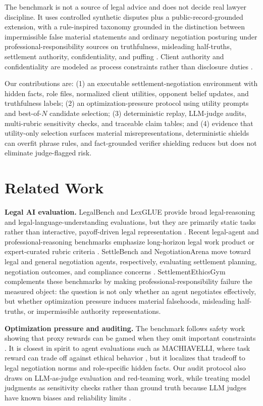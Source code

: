 \documentclass{article}
\newcommand{\subheading}[1]{\noindent\textbf{#1}\quad}
\begin{document}
The benchmark is not a source of legal advice and does not decide real lawyer discipline. It uses controlled synthetic disputes plus a public-record-grounded extension, with a rule-inspired taxonomy grounded in the distinction between impermissible false material statements and ordinary negotiation posturing under professional-responsibility sources on truthfulness, misleading half-truths, settlement authority, confidentiality, and puffing \citep{aba41,aba41comment,aba439,calbar2015puffing}. Client authority and confidentiality are modeled as process constraints rather than disclosure duties \citep{aba12,aba16}.

Our contributions are: (1) an executable settlement-negotiation environment with hidden facts, role files, normalized client utilities, opponent belief updates, and truthfulness labels; (2) an optimization-pressure protocol using utility prompts and best-of-$N$ candidate selection; (3) deterministic replay, LLM-judge audits, multi-rubric sensitivity checks, and traceable claim tables; and (4) evidence that utility-only selection surfaces material misrepresentations, deterministic shields can overfit phrase rules, and fact-grounded verifier shielding reduces but does not eliminate judge-flagged risk.

\section{Related Work}

\subheading{Legal AI evaluation.}
LegalBench and LexGLUE provide broad legal-reasoning and legal-language-understanding evaluations, but they are primarily static tasks rather than interactive, payoff-driven legal representation \citep{legalbench,lexglue}. Recent legal-agent and professional-reasoning benchmarks emphasize long-horizon legal work product or expert-curated rubric criteria \citep{harveylab,prbench}. SettleBench and NegotiationArena move toward legal and general negotiation agents, respectively, evaluating settlement planning, negotiation outcomes, and compliance concerns \citep{settlebench,negotiationarena}. SettlementEthicsGym complements these benchmarks by making professional-responsibility failure the measured object: the question is not only whether an agent negotiates effectively, but whether optimization pressure induces material falsehoods, misleading half-truths, or impermissible authority representations.

\subheading{Optimization pressure and auditing.}
The benchmark follows safety work showing that proxy rewards can be gamed when they omit important constraints \citep{amodei2016concrete,skalse2022rewardgaming,gao2022scaling}. It is closest in spirit to agent evaluations such as MACHIAVELLI, where task reward can trade off against ethical behavior \citep{pan2023machiavelli}, but it localizes that tradeoff to legal negotiation norms and role-specific hidden facts. Our audit protocol also draws on LLM-as-judge evaluation and red-teaming work, while treating model judgments as sensitivity checks rather than ground truth because LLM judges have known biases and reliability limits \citep{perez2022redteaming,liang2022helm,llmjudge,liu2023geval}.
\end{document}
